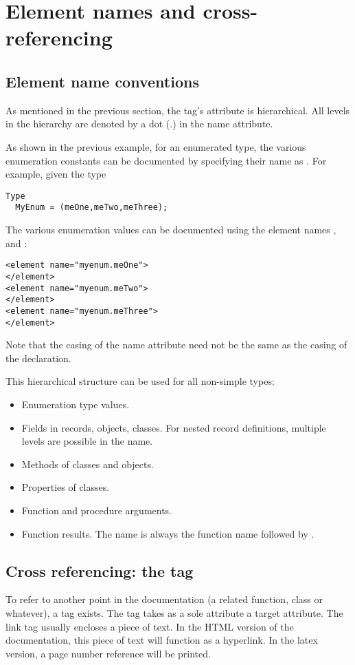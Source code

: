 \section{Element names and cross-referencing}

\subsection{Element name conventions}
As mentioned in the previous section, the  tag's 
attribute is hierarchical. All levels in the hierarchy are denoted by a dot
(.) in the name attribute. 

As shown in the previous example, for an enumerated type, the various
enumeration constants can be documented by specifying their name as
. For example, given the type
\begin{verbatim}
Type
  MyEnum = (meOne,meTwo,meThree);
\end{verbatim}
The various enumeration values can be documented using the element names
,  and :
\begin{verbatim}
<element name="myenum.meOne">
</element>
<element name="myenum.meTwo">
</element>
<element name="myenum.meThree">
</element>
\end{verbatim}
Note that the casing of the name attribute need not be the same as the
casing of the declaration.

This hierarchical structure can be used for all non-simple types: 
\begin{itemize}
\item Enumeration type values.
\item Fields in records, objects, classes. For nested record definitions,
multiple levels are possible in the name.
\item Methods of classes and objects.
\item Properties of classes.
\item Function and procedure arguments. 
\item Function results. The name is always the function name followed by
.
\end{itemize}

\subsection{Cross referencing: the  tag}
To refer to another point in the documentation (a related function, class or
whatever), a  tag exists. The  tag takes as a sole
attribute a target  attribute. The link tag usually encloses a
piece of text. In the HTML version of the documentation, this piece of text
will function as a hyperlink. In the latex version, a page number reference
will be printed. 

